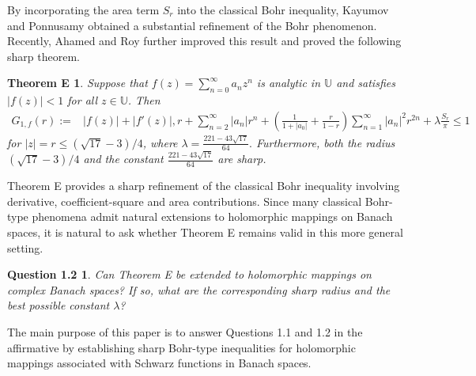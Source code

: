 \documentclass[11pt, reqno]{amsart}
\newtheorem*{theoE}{Theorem E}
\newtheorem*{cor A}{Corollary A}
\newtheorem*{cor B}{Corollary B}
\newtheorem*{que2}{Question 1.2}
\numberwithin{equation}{section}
\begin{document}
By incorporating the area term $S_r$ into the classical Bohr inequality, Kayumov and Ponnusamy \cite{KP2018} obtained a substantial refinement of the Bohr phenomenon. Recently, Ahamed and Roy \cite{AR2025} further improved this result and proved the following sharp theorem.

\begin{theoE}\cite[Theorem 2.3]{AR2025}
Suppose that $f(z)=\sum_{n=0}^{\infty}a_nz^n$ is analytic in $\mathbb U$ and satisfies $|f(z)|<1$ for all $z\in\mathbb U$. Then
\[
\begin{aligned}
G_{1,f}(r)
:=&
|f(z)|
+|f'(z)|,r
+\sum_{n=2}^{\infty}|a_n|r^n
+\left(\frac{1}{1+|a_0|}
+\frac{r}{1-r}\right)
\sum_{n=1}^{\infty}|a_n|^2r^{2n}
+\lambda\frac{S_r}{\pi}
\le1
\end{aligned}
\]
for $|z|=r\le(\sqrt{17}-3)/4$, where $\lambda=\frac{221-43\sqrt{17}}{64}.$
Furthermore, both the radius $(\sqrt{17}-3)/4$ and the constant $\frac{221-43\sqrt{17}}{64}$
are sharp.
\end{theoE}

Theorem E provides a sharp refinement of the classical Bohr inequality involving derivative, coefficient-square and area contributions. Since many classical Bohr-type phenomena admit natural extensions to holomorphic mappings on Banach spaces, it is natural to ask whether Theorem E remains valid in this more general setting.

\medskip

\noindent
\begin{que2}
Can Theorem E be extended to holomorphic mappings on complex Banach spaces? If so, what are the corresponding sharp radius and the best possible constant $\lambda$?
\end{que2}
\medskip

The main purpose of this paper is to answer Questions 1.1 and 1.2 in the affirmative by establishing sharp Bohr-type inequalities for holomorphic mappings associated with Schwarz functions in Banach spaces.
\end{document}
